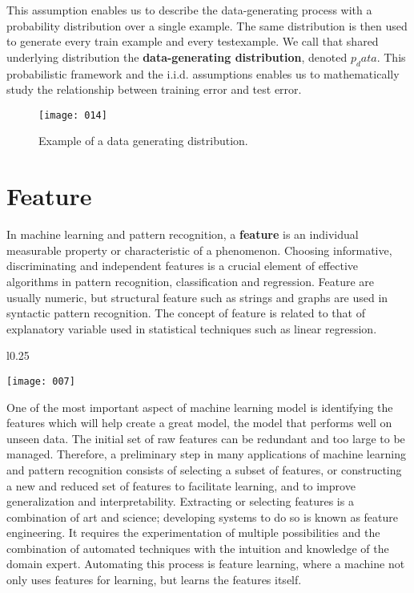 This assumption enables us to describe the data-generating process with a probability distribution over a single example. The same distribution is then used to generate every train example and every testexample. We call that shared underlying distribution the \textbf{data-generating distribution}, denoted \(p_data\). This probabilistic framework and the i.i.d. assumptions enables us to mathematically study the relationship between training error and test error.
\begin{figure}[h]
\begin{center}
    \texttt{[image: 014]}
    \caption{}
\end{center}
\caption{Example of a data generating distribution.}
\end{figure}


\section{Feature}
In machine learning and pattern recognition, a \textbf{feature} is an individual measurable property or characteristic of a phenomenon. Choosing informative, discriminating and independent features is a crucial element of effective algorithms in pattern recognition, classification and regression. Feature are usually numeric, but structural feature such as strings and graphs are used in syntactic pattern recognition. The concept of feature is related to that of explanatory variable used in statistical techniques such as linear regression.

\begin{wrapfigure}{l}{0.25\textwidth}
    \begin{center}
      \texttt{[image: 007]}
    \end{center}
\end{wrapfigure}

One of the most important aspect of machine learning model is identifying the features which will help create a great model, the model that performs well on unseen data. The initial set of raw features can be redundant and too large to be managed. Therefore, a preliminary step in many applications of machine learning and pattern recognition consists of selecting a subset of features, or constructing a new and reduced set of features to facilitate learning, and to improve generalization and interpretability. Extracting or selecting features is a combination of art and science; developing systems to do so is known as feature engineering. It requires the experimentation of multiple possibilities and the combination of automated techniques with the intuition and knowledge of the domain expert. Automating this process is feature learning, where a machine not only uses features for learning, but learns the features itself.

